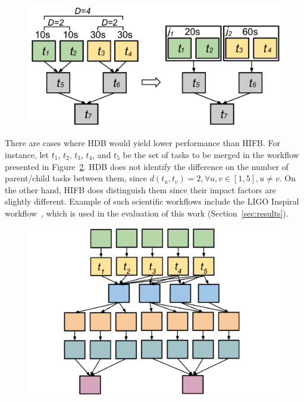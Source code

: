 \begin{figure}[!htb]
	\centering
	\includegraphics[width=0.85\linewidth]{figures/imbalance/hdb.pdf}
	\label{fig:imbalance_hdb}
\end{figure}

There are cases where HDB would yield lower performance than HIFB. For instance, let $t_1$, $t_2$, $t_3$, $t_4$, and $t_5$ be the set of tasks to be merged in the workflow presented in Figure~\ref{fig:imbalance_hifb_hdb}. HDB does not identify the difference on the number of parent/child tasks between them, since $d(t_u,t_v) = 2, \forall u,v \in [1,5], u \neq v$. On the other hand, HIFB does distinguish them since their impact factors are slightly different. Example of such scientific workflows include the LIGO Inspiral workflow~\cite{LIGO}, which is used in the evaluation of this work (Section~\ref{sec:results}).

\begin{figure}[!htb]
	\centering
	\includegraphics[width=0.85\linewidth]{figures/imbalance/hifb_vs_hdb.pdf}
	\label{fig:imbalance_hifb_hdb}
\end{figure}

